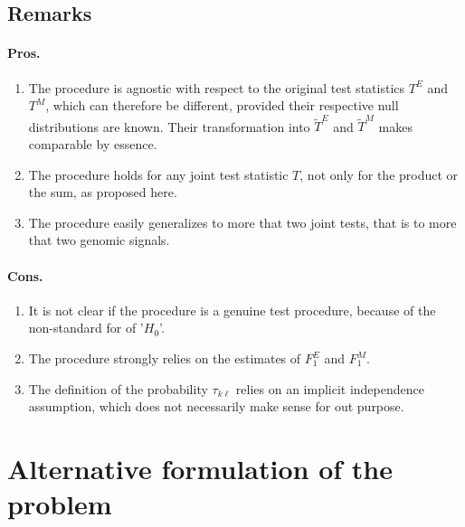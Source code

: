 \documentclass[a4paper, 11pt]{article}
\newcommand{\Tt}{\widetilde{T}}
\begin{document}
\subsection{Remarks}

\paragraph{Pros.} 
\begin{enumerate}
 \item The procedure is agnostic with respect to the original test statistics $T^E$ and $T^M$, which can therefore be different, provided their respective null distributions are known. Their transformation into $\Tt^E$ and $\Tt^M$ makes comparable by essence.
 \item The procedure holds for any joint test statistic $T$, not only for the product or the sum, as proposed here.
 \item The procedure easily generalizes to more that two joint tests, that is to more that two genomic signals.
\end{enumerate}

\paragraph{Cons.} 
\begin{enumerate}
 \item It is not clear if the procedure is a genuine test procedure, because of the non-standard for of '$H_0$'.
 \item The procedure strongly relies on the estimates of $F^E_1$ and $F^M_1$.
 \item The definition of the probability $\tau_{k\ell}$ relies on an implicit independence assumption, which does not necessarily make sense for out purpose.
\end{enumerate}

\newpage
\section{Alternative formulation of the problem}

\end{document}
